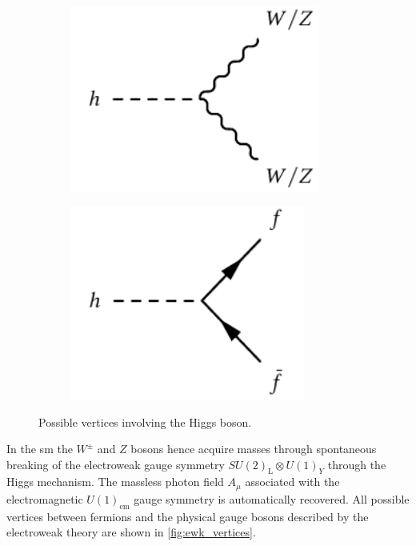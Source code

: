 \begin{figure}
\begin{subfigure}[b]{0.30\linewidth}
	\end{subfigure}
	\par\medskip
	\begin{subfigure}[b]{0.30\linewidth}
		\centering\includegraphics[width=0.9\textwidth]{h_boson_gauge_vertex}
	\end{subfigure}%
	\begin{subfigure}[b]{0.30\linewidth}
		\centering\includegraphics[width=0.85\textwidth]{h_boson_fermion_vertex}
	\end{subfigure}	
	\caption{Possible vertices involving the Higgs boson.}
	\label{fig:higgs_vertices}
\end{figure}

In the \gls{sm} the $W^\pm$ and $Z$ bosons hence acquire masses through spontaneous breaking of the electroweak gauge symmetry $SU(2)_\mathrm{L}\otimes U(1)_Y$ through the Higgs mechanism. The massless photon field $A_\mu$ associated with the electromagnetic $U(1)_\mathrm{em}$ gauge symmetry is automatically recovered. All possible vertices between fermions and the physical gauge bosons described by the electroweak theory are shown in \cref{fig:ewk_vertices}. 

